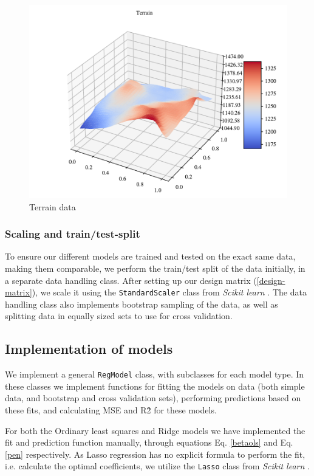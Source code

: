 \begin{figure}
    \centering
    \includegraphics[width=1\linewidth]{project_1_alt/figures/data/terrain_41.pdf}
    \caption{Terrain data}
    \label{data:terrain}
\end{figure}


\subsubsection{Scaling and train/test-split}
To ensure our different models are trained and tested on the exact same data, making them comparable, we perform the train/test split of the data initially, in a separate data handling class.
After setting up our design matrix (\ref{design-matrix}), we scale it using the \texttt{StandardScaler} class from \textit{Scikit learn} \cite{sklearn}.
The data handling class also implements bootstrap sampling of the data, as well as splitting data in equally sized sets to use for cross validation.

\subsection{Implementation of models}
We implement a general \texttt{RegModel} class, with subclasses for each model type.
In these classes we implement functions for fitting the models on data (both simple data, and bootstrap and cross validation sets), performing predictions based on these fits, and calculating MSE and R\^2 for these models.

For both the Ordinary least squares and Ridge models we have implemented the fit and prediction function manually, through equations Eq. \ref{betaols} and Eq. \ref{pen} respectively.
As Lasso regression has no explicit formula to perform the fit, i.e. calculate the optimal coefficients, we utilize the \texttt{Lasso} class from \textit{Scikit learn} \cite{sklearn}.

